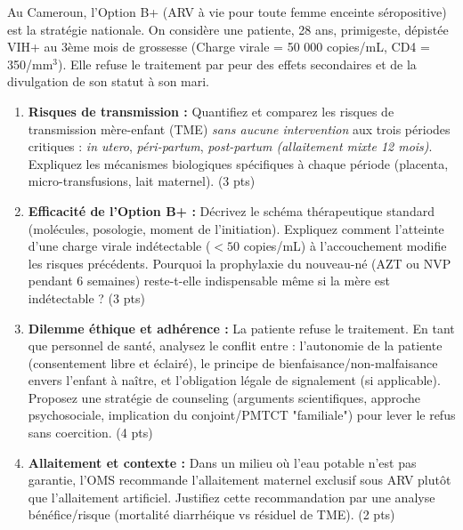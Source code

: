 \documentclass[11pt]{article}
\begin{document}
\begin{exercice}
Au Cameroun, l'Option B+ (ARV à vie pour toute femme enceinte séropositive) est la stratégie nationale. On considère une patiente, 28 ans, primigeste, dépistée VIH+ au 3ème mois de grossesse (Charge virale = 50 000 copies/mL, CD4 = 350/mm$^3$). Elle refuse le traitement par peur des effets secondaires et de la divulgation de son statut à son mari.
\begin{enumerate}
    \item \textbf{Risques de transmission :} Quantifiez et comparez les risques de transmission mère-enfant (TME) \textit{sans aucune intervention} aux trois périodes critiques : \textit{in utero}, \textit{péri-partum}, \textit{post-partum (allaitement mixte 12 mois)}. Expliquez les mécanismes biologiques spécifiques à chaque période (placenta, micro-transfusions, lait maternel). (3 pts)
    \item \textbf{Efficacité de l'Option B+ :} Décrivez le schéma thérapeutique standard (molécules, posologie, moment de l'initiation). Expliquez comment l'atteinte d'une charge virale indétectable ($< 50$ copies/mL) à l'accouchement modifie les risques précédents. Pourquoi la prophylaxie du nouveau-né (AZT ou NVP pendant 6 semaines) reste-t-elle indispensable même si la mère est indétectable ? (3 pts)
    \item \textbf{Dilemme éthique et adhérence :} La patiente refuse le traitement. En tant que personnel de santé, analysez le conflit entre : l'autonomie de la patiente (consentement libre et éclairé), le principe de bienfaisance/non-malfaisance envers l'enfant à naître, et l'obligation légale de signalement (si applicable). Proposez une stratégie de counseling (arguments scientifiques, approche psychosociale, implication du conjoint/PMTCT "familiale") pour lever le refus sans coercition. (4 pts)
    \item \textbf{Allaitement et contexte :} Dans un milieu où l'eau potable n'est pas garantie, l'OMS recommande l'allaitement maternel exclusif sous ARV plutôt que l'allaitement artificiel. Justifiez cette recommandation par une analyse bénéfice/risque (mortalité diarrhéique vs résiduel de TME). (2 pts)
\end{enumerate}
\end{exercice}
\end{document}
